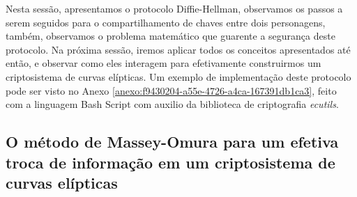 Nesta sessão, apresentamos o protocolo Diffie-Hellman, observamos os passos a
serem seguidos para o compartilhamento de chaves entre dois personagens,
também, observamos o problema matemático que guarente a segurança deste
protocolo. Na próxima sessão, iremos aplicar todos os conceitos apresentados
até então, e observar como eles interagem para efetivamente construirmos um
criptosistema de curvas elípticas. Um exemplo de implementação deste protocolo
pode ser visto no Anexo \ref{anexo:f9430204-a55e-4726-a4ca-167391db1ca3}, feito
com a linguagem Bash Script com auxilio da biblioteca de criptografia
\textit{ecutils}.

\subsection{O método de Massey-Omura para um efetiva troca de informação em um criptosistema de curvas elípticas}

